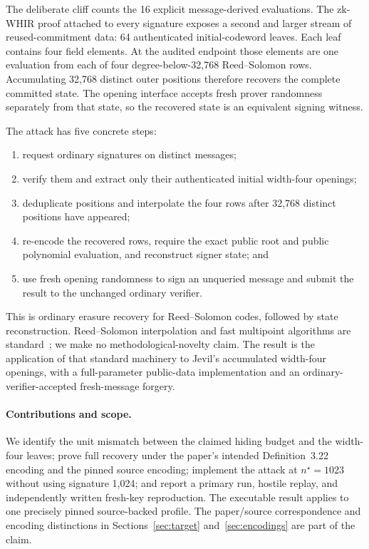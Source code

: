 \documentclass[10pt,a4paper]{article}
\begin{document}
The deliberate cliff counts the 16 explicit message-derived evaluations. The
zk-WHIR proof attached to every signature exposes a second and larger stream of
reused-commitment data: 64 authenticated initial-codeword leaves. Each leaf
contains four field elements. At the audited endpoint those elements are one
evaluation from each of four degree-below-32,768 Reed--Solomon rows. Accumulating
32,768 distinct outer positions therefore recovers the complete committed
state. The opening interface accepts fresh prover randomness separately from
that state, so the recovered state is an equivalent signing witness.

The attack has five concrete steps:
\begin{enumerate}
  \item request ordinary signatures on distinct messages;
  \item verify them and extract only their authenticated initial width-four
        openings;
  \item deduplicate positions and interpolate the four rows after 32,768
        distinct positions have appeared;
  \item re-encode the recovered rows, require the exact public root and public
        polynomial evaluation, and reconstruct signer state; and
  \item use fresh opening randomness to sign an unqueried message and submit
        the result to the unchanged ordinary verifier.
\end{enumerate}

This is ordinary erasure recovery for Reed--Solomon codes, followed by state
reconstruction. Reed--Solomon interpolation and fast multipoint algorithms are
standard~\cite{reedsolomon,mca}; we make no methodological-novelty claim. The
result is the application of that standard machinery to Jevil's accumulated
width-four openings, with a full-parameter public-data implementation and an
ordinary-verifier-accepted fresh-message forgery.

\paragraph{Contributions and scope.}
We identify the unit mismatch between the claimed hiding budget and the
width-four leaves; prove full recovery under the paper's intended
Definition~3.22 encoding and the pinned source encoding; implement the attack
at $n^\star=1023$ without using signature 1,024; and report a primary run,
hostile replay, and independently written fresh-key reproduction. The
executable result applies to one precisely pinned source-backed profile. The
paper/source correspondence and encoding distinctions in
Sections~\ref{sec:target} and~\ref{sec:encodings} are part of the claim.
\end{document}
